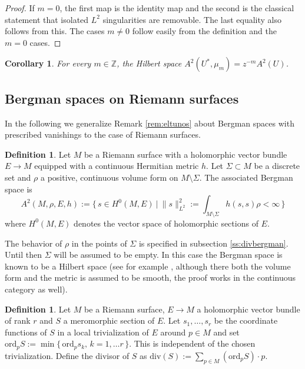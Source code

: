 \documentclass[11pt]{amsart}
\newtheorem{corollary}[theorem]{Corollary}
\theoremstyle{definition}
\newtheorem{definition}[theorem]{Definition}
\begin{document}
\begin{proof} If $m=0$, the first map is the identity map and the second is the classical statement that isolated $L^2$ singularities are removable. The last equality also follows from this.
The cases $m\not=0$ follow easily from the definition and the $m=0$ cases. 
\end{proof}
\begin{corollary}\label{cor:L2sing}
 For
 every $m\in\mathbb Z$, the Hilbert space
 $A^2(U^*,\mu_m)=z^{-m}A^2(U)$.
\end{corollary}

\subsection{Bergman spaces on Riemann surfaces}
In the following we generalize Remark \ref{rem:eltunos} about Bergman spaces with prescribed vanishings to the case of Riemann surfaces.
 \begin{definition}\label{def:simabergman}
    Let $M$ be a Riemann surface with a holomorphic vector bundle $E\to M$ equipped with a continuous Hermitian metric $h$. Let $\Sigma\subset M$ be a discrete set and $\rho$ a positive, continuous volume form on $M\setminus\Sigma$. The associated Bergman space is
    $$A^2(M,\rho,E,h) := \Big\{\, s \in H^0(M,E) \ \Big| \ \|s\|_{L^2}^2:= \int_{M\setminus \Sigma} h(s,s)\rho < \infty \, \Big\}$$
    where $H^0(M,E)$ denotes the vector space of holomorphic sections of $E$.
\end{definition}

\noindent The behavior of $\rho$ in the points of $\Sigma$ is specified in subsection \ref{ss:divbergman}. Until then $\Sigma$ will be assumed to be empty. In this case the Bergman space is known to be a Hilbert space (see for example \cite{PW94}, although there both the volume form and the metric is assumed to be smooth, the proof works in the continuous category as well).

\begin{definition}\label{definition:div} 
Let $M$ be a Riemann surface, $E\rightarrow M$ a holomorphic vector bundle of rank $r$ and $S$  a meromorphic section of $E$. Let $s_1, \dots, s_r$ be the coordinate functions of $S$ in a local trivialization of $E$ around $p \in M$ and set $\text{ord}_pS:=\min\{\,\text{ord}_ps_k, \,k=1,\dots r\,\}$. This is independent of the chosen trivialization. Define the divisor of $S$ as
$\text{div}(S):=\sum_{p\in M}(\text{ord}_pS)\cdot p$.   
\end{definition}
\end{document}
